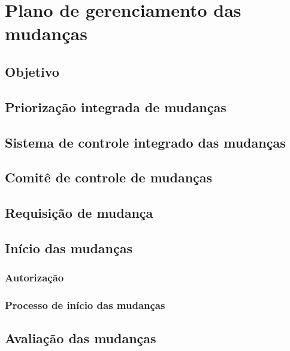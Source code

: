 \chapter{Plano de gerenciamento das mudanças} %
\label{ch:change-management-plan}


\section{Objetivo}

\section{Priorização integrada de mudanças}
\label{sec:integrated-change-priorization}

\section{Sistema de controle integrado das mudanças}
\label{sec:change-control-system}

\section{Comitê de controle de mudanças}

\section{Requisição de mudança}

\section{Início das mudanças}

\subsection{Autorização}

\subsection{Processo de início das mudanças}

\section{Avaliação das mudanças}


